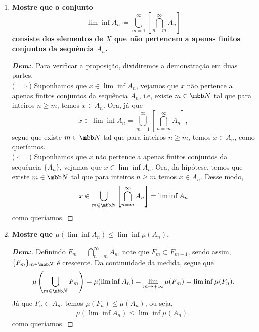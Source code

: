 \begin{enumerate}[label=(\alph*), wide, labelindent=0pt]
\begin{proof}[\textbf{Dem:}]
      \begin{align*}
        \mu(\lim\sup A_n) = \lim_{n \rightarrow +\infty}\mu(F_n) = 
        \lim\sup \mu(F_n) \ge \lim\sup \mu(A_n).
      \end{align*}
      Com isso, temos o que queríamos. Como exemplo em que a desigualdade é falsa, 
      considere $A_n = (n, +\infty)$. Já que $\mu(A_n) = +\infty$ para todo $n \in \mbb N$,
      então, $\lim\sup \mu(A_n) = +\infty$. Entretanto, visto que para todo $x \in \mbb R$,
      existe $M \in \mbb N$ tal que $x < M$, segue que $\lim\sup A_n = \emptyset$, ou seja, 
      $\mu(\lim\sup A_n) = 0$.
    \end{proof}
  \item \textbf{Mostre que o conjunto 
    $$\lim \inf A_n \coloneq \bigcup\limits_{m=1}^\infty\left[\bigcap\limits_{n=m}^\infty 
    A_n\right]$$
    consiste dos elementos de $X$ que não pertencem a apenas finitos conjuntos da  
    sequência $A_n$.}
    \begin{proof}[\textbf{Dem:}] Para verificar a proposição, dividiremos a demonstração 
      em duas partes.\\
      ($\implies$) Suponhamos que $x \in \lim\inf A_n$, vejamos que $x$ não pertence a apenas 
      finitos conjuntos da sequência $A_n$, i.e, existe $m \in \mbb N$ tal que para 
      inteiros $n \ge m$, temos $x \in A_n$. Ora, já que
      $$x \in \lim\inf A_n = \bigcup\limits_{m=1}^\infty\left[\bigcap\limits_{n=m}^\infty 
    A_n\right],$$
      segue que existe $m \in \mbb N$ tal que para inteiros $n \ge m$, temos $x \in A_n$,
      como queríamos.\\
      ($\impliedby$) Suponhamos que $x$ não pertence a apenas finitos conjuntos da sequência 
      $\{A_n\}$, vejamos que $x \in \lim\inf A_n$. Ora, da hipótese, temos que existe 
      $m \in \mbb N$ tal que para inteiros $n \ge m$ temos $x \in A_n$. Desse modo, 
      $$x \in \bigcup\limits_{m \in \mbb N}\left[\bigcap\limits_{n=m}^\infty A_n\right]
      = \lim \inf A_n$$
      como queríamos.
    \end{proof}
  \item \textbf{Mostre que $\mu(\lim \inf A_n) \le \lim\inf \mu(A_n)$.}
    \begin{proof}[\textbf{Dem:}] Definindo $F_m = \bigcap\limits_{n = m}^\infty A_n$,
      note que $F_m \subset F_{m+1}$, sendo assim, $\{F_m\}_{m \in \mbb N}$ é crescente. 
      Da continuidade da medida, segue que 
      \begin{align*}
        \mu\left(\bigcup_{m \in \mbb N} F_m\right)
        = \mu(\lim\inf A_n)
        = \lim_{m \rightarrow +\infty} \mu(F_m) = \lim\inf \mu(F_n).
      \end{align*}
      Já que $F_n \subset A_n$, temos $\mu(F_n) \le \mu(A_n)$, ou seja,
      \begin{align*}
        \mu(\lim\inf A_n) \le \lim\inf \mu(A_n),
      \end{align*}
      como queríamos.
    \end{proof}
\end{enumerate}
\biglinend

